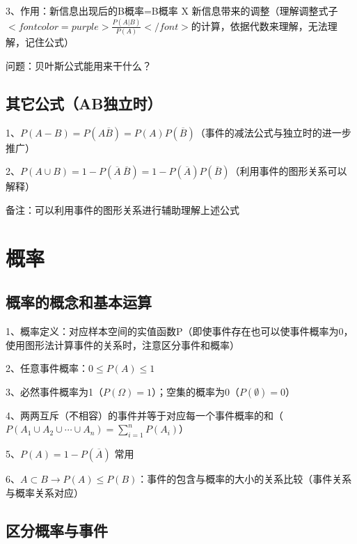 3、作用：新信息出现后的B概率=B概率 X 新信息带来的调整（理解调整式子$ <font color=purple>\frac{P(A|B)}{P(A)}</font> $的计算，依据代数来理解，无法理解，记住公式）

问题：贝叶斯公式能用来干什么？



\subsection{其它公式（AB独立时）}

1、$ P(A-B) = P(A\overline B)=P(A)P(\overline B) $（事件的减法公式与独立时的进一步推广）

2、$ P(A\cup B) = 1-P(\overline A \  \overline B) = 1-P(\overline A)P(  \overline B) $（利用事件的图形关系可以解释）



备注：可以利用事件的图形关系进行辅助理解上述公式

\section{概率}



\subsection{概率的概念和基本运算}

1、概率定义：对应样本空间的实值函数P（即使事件存在也可以使事件概率为0，使用图形法计算事件的关系时，注意区分事件和概率）

2、任意事件概率：$ 0 \leqslant P(A)\leqslant 1 $

3、必然事件概率为1（$ P(\Omega)=1 $）；空集的概率为0（$ P(\emptyset)=0 $）

4、两两互斥（不相容）的事件并等于对应每一个事件概率的和（$ P\left(A_{1} \cup A_{2} \cup \cdots \cup A_{n}\right)=\sum_{i=1}^{n} P\left(A_{i}\right) $）

5、$ P(A)=1-P(\overline A) $ 常用

6、$ A \subset B\rightarrow P(A) \leqslant P(B) $：事件的包含与概率的大小的关系比较（事件关系与概率关系对应）



\subsection{区分概率与事件}

